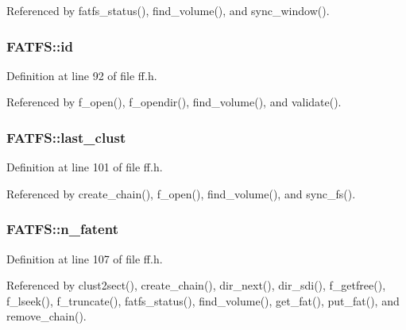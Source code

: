 Referenced by fatfs\+\_\+status(), find\+\_\+volume(), and sync\+\_\+window().

\subsubsection[{\texorpdfstring{id}{id}}]{ F\+A\+T\+F\+S\+::id}\hypertarget{structFATFS_a417095d7c20d56d417dc0998e0dd5a5c}{}\label{structFATFS_a417095d7c20d56d417dc0998e0dd5a5c}


Definition at line 92 of file ff.\+h.



Referenced by f\+\_\+open(), f\+\_\+opendir(), find\+\_\+volume(), and validate().

\subsubsection[{\texorpdfstring{last\+\_\+clust}{last_clust}}]{ F\+A\+T\+F\+S\+::last\+\_\+clust}\hypertarget{structFATFS_ad315def289218e26ab78ff90fde700d1}{}\label{structFATFS_ad315def289218e26ab78ff90fde700d1}


Definition at line 101 of file ff.\+h.



Referenced by create\+\_\+chain(), f\+\_\+open(), find\+\_\+volume(), and sync\+\_\+fs().

\subsubsection[{\texorpdfstring{n\+\_\+fatent}{n_fatent}}]{ F\+A\+T\+F\+S\+::n\+\_\+fatent}\hypertarget{structFATFS_a8da50eeba6469bc20d60ca0cf9a1307c}{}\label{structFATFS_a8da50eeba6469bc20d60ca0cf9a1307c}


Definition at line 107 of file ff.\+h.



Referenced by clust2sect(), create\+\_\+chain(), dir\+\_\+next(), dir\+\_\+sdi(), f\+\_\+getfree(), f\+\_\+lseek(), f\+\_\+truncate(), fatfs\+\_\+status(), find\+\_\+volume(), get\+\_\+fat(), put\+\_\+fat(), and remove\+\_\+chain().


